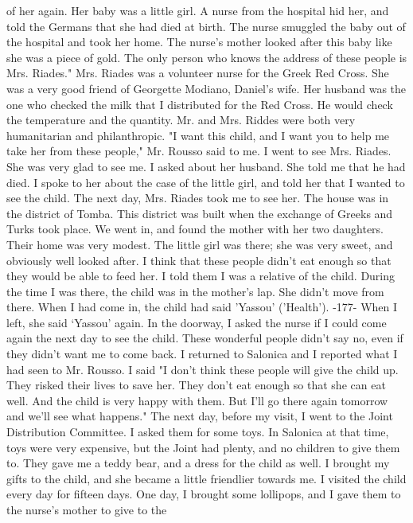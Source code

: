 of her again.
Her baby was a little girl.
A nurse from the hospital 
hid her, and told the Germans that she had died at birth.
The nurse 
smuggled the baby out of the hospital and took her home.
The nurse's 
mother looked after this baby like she was a piece of gold.
The only 
person who knows the address of these people is Mrs.
Riades."
Mrs.
Riades was a volunteer nurse for the Greek Red Cross.
She was 
a very good friend of Georgette Modiano, Daniel's wife.
Her husband was 
the one who checked the milk that I distributed for the Red Cross.
He 
would check the temperature and the quantity.
Mr.
and Mrs.
Riddes were 
both very humanitarian and philanthropic.
"I want this child, and I want you to help me take her from these 
people," Mr.
Rousso said to me.
I went to see Mrs.
Riades.
She was very glad to see me.
I asked 
about her husband.
She told me that he had died.
I spoke to her about 
the case of the little girl, and told her that I wanted to see the 
child.
The next day, Mrs.
Riades took me to see her.
The house was in the district of Tomba.
This district was built 
when the exchange of Greeks and Turks took place.
We went in, and found 
the mother with her two daughters.
Their home was very modest.
The 
little girl was there; she was very sweet, and obviously well looked after.
I think that these people didn't eat enough so that they would be 
able to feed her.
I told them I was a relative of the child.
During the time I was there, the child was in the mother's lap.
She didn't move
from there.
When I had come in, the child had said 'Yassou' ('Health').
-177- 
When I left, she said ‘Yassou’ again.
In the doorway, I asked the nurse 
if I could come again the next day to see the child.
These wonderful 
people didn't say no, even if they didn't want me to come back.
I returned to Salonica and I reported what I had seen to Mr.
Rousso.
I said "I don't think these people will give the child up.
They risked 
their lives to save her.
They don't eat enough so that she can eat well.
And the child is very happy with them.
But I'll go there again tomorrow 
and we'll see what happens."
The next day, before my visit, I went to the Joint Distribution 
Committee.
I asked them for some toys.
In Salonica at that time, toys 
were very expensive, but the Joint had plenty, and no children to give 
them to.
They gave me a teddy bear, and a dress for the child as well.
I brought my gifts to the child, and she became a little friendlier towards me.
I visited the child every day for fifteen days.
One day, I brought 
some lollipops, and I gave them to the nurse's mother to give to the 
